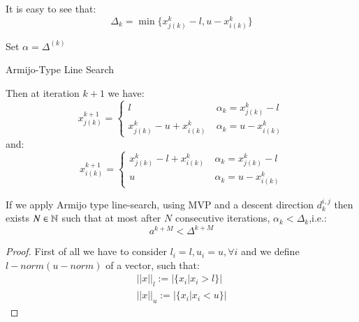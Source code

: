 It is easy to see that:
\begin{equation*}
\Delta_k=\min \{ x^k_{j(k)}-l, u-x^k_{i(k)}\}
\end{equation*}
\begin{algorithm}[ht]
 Set $\alpha = \Delta^{(k)}$\\
 \caption{Armijo-Type Line Search}
\end{algorithm}
\iffalse
Then at iteration $k+1$ we have:
\begin{equation*}
x^{k+1}_{j(k)}=\begin{cases}
 l \ &\alpha_k=x^k_{j(k)}-l\\
 x^k_{j(k)}-u+x^k_{i(k)} \ &\alpha_k=u-x^k_{i(k)}
 \end{cases}
\end{equation*}
and:
\begin{equation*}
x^{k+1}_{i(k)}=\begin{cases}
 x^k_{j(k)}-l+x^k_{i(k)} \ &\alpha_k=x^k_{j(k)}-l\\
 u \ &\alpha_k=u-x^k_{i(k)}
 \end{cases}
\end{equation*}




\begin{proposition}\label{proposition:david}
 If we apply Armijo type line-search, using MVP and a descent direction $d_k^{i,j}$ then exists $N \in \mathbb{N}$ such that at most after $N$ consecutive iterations, $\alpha_k<\Delta_k$,i.e.:
 \begin{equation}
  a^{k+M}<\Delta^{k+M}
 \end{equation}
\end{proposition}
\begin{proof}
First of all we have to consider $l_i = l, u_i=u, \forall i$ and we define $l-norm (u-norm)$ of a vector, such that:
\begin{equation*}
\begin{aligned}
 ||x||_l:= |\{x_i| x_i >l\}| \\
 ||x||_u:= |\{x_i| x_i <u\}| 
 \end{aligned}
\end{equation*}
\end{proof}

